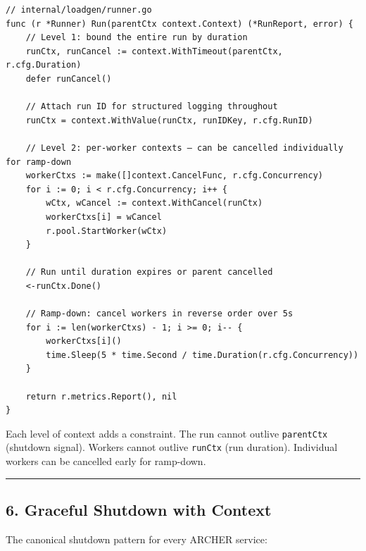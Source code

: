 \documentclass[11pt,a4paper,oneside]{book}
\begin{document}
\begin{verbatim}
// internal/loadgen/runner.go
func (r *Runner) Run(parentCtx context.Context) (*RunReport, error) {
    // Level 1: bound the entire run by duration
    runCtx, runCancel := context.WithTimeout(parentCtx, r.cfg.Duration)
    defer runCancel()

    // Attach run ID for structured logging throughout
    runCtx = context.WithValue(runCtx, runIDKey, r.cfg.RunID)

    // Level 2: per-worker contexts — can be cancelled individually for ramp-down
    workerCtxs := make([]context.CancelFunc, r.cfg.Concurrency)
    for i := 0; i < r.cfg.Concurrency; i++ {
        wCtx, wCancel := context.WithCancel(runCtx)
        workerCtxs[i] = wCancel
        r.pool.StartWorker(wCtx)
    }

    // Run until duration expires or parent cancelled
    <-runCtx.Done()

    // Ramp-down: cancel workers in reverse order over 5s
    for i := len(workerCtxs) - 1; i >= 0; i-- {
        workerCtxs[i]()
        time.Sleep(5 * time.Second / time.Duration(r.cfg.Concurrency))
    }

    return r.metrics.Report(), nil
}
\end{verbatim}

Each level of context adds a constraint. The run cannot outlive
\texttt{parentCtx} (shutdown signal). Workers cannot outlive
\texttt{runCtx} (run duration). Individual workers can be cancelled
early for ramp-down.

\begin{center}\rule{0.5\linewidth}{0.5pt}\end{center}

\subsection{6. Graceful Shutdown with
Context}

The canonical shutdown pattern for every ARCHER service:
\end{document}
